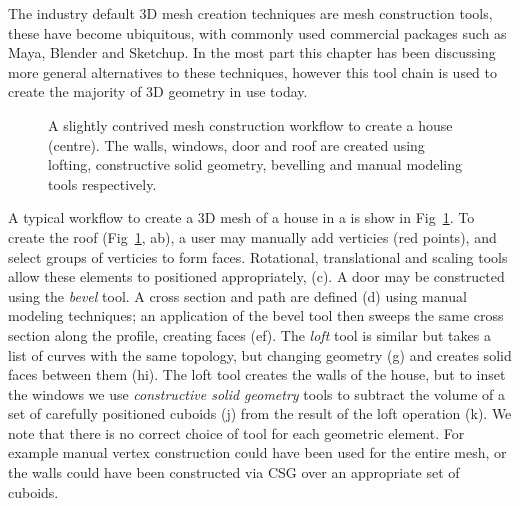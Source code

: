 


The industry default 3D mesh creation techniques are mesh construction tools, these have become ubiquitous, with commonly used commercial packages such as Maya\cite{Maya}, Blender\cite{Blender} and Sketchup\cite{Sketchup}. In the most part this chapter has been discussing more general alternatives to these techniques, however this tool chain is used to create the majority of 3D geometry in use today.

\begin{figure}
\centering
\def\svgwidth{1.\columnwidth}

\caption[Mesh modeling techniques]{A slightly contrived mesh construction workflow to create a house (centre). The walls, windows, door and roof are created using lofting, constructive solid geometry, bevelling and manual modeling tools respectively.}
\label{fig:mesh}
\end{figure}

A typical workflow to create a 3D mesh of a house in a  is show in Fig~\ref{fig:mesh}. To create the roof (Fig~\ref{fig:mesh}, ab), a user may manually add verticies (red points), and select groups of verticies to form faces. Rotational, translational and scaling tools allow these elements to positioned appropriately, (c). A door may be constructed using the \emph{bevel} tool. A cross section and path are defined (d) using manual modeling techniques; an application of the bevel tool then sweeps the same cross section along the profile, creating faces (ef). The \emph{loft} tool is similar but takes a list of curves with the same topology, but changing geometry (g) and creates solid faces between them (hi). The loft tool creates the walls of the house, but to inset the windows we use \emph{constructive solid geometry} tools\cite{Tilove80} to subtract the volume of a set of carefully positioned cuboids (j) from the result of the loft operation (k). We note that there is no correct choice of tool for each geometric element. For example manual vertex construction could have been used for the entire mesh, or the walls could have been constructed via CSG over an appropriate set of cuboids.

